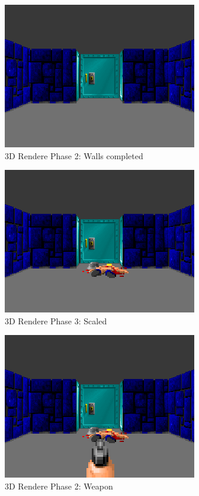 \documentclass[book.tex]{subfiles}
\begin{document}
 
 \begin{figure}[H]
\centering
 \includegraphics[scale=1.3]{screenshots/wolf4d_2_walls.png}
 \caption{3D Rendere Phase 2: Walls completed} \label{fig:mips}
 \end{figure}
 
 
 \begin{figure}[H]
\centering
 \includegraphics[scale=1.3]{screenshots/wolf3d_6_scaled}
 \caption{3D Rendere Phase 3: Scaled} \label{fig:mips}
 \end{figure}

 \begin{figure}[H]
\centering
 \includegraphics[scale=1.3]{screenshots/wolf3d_7_fullframe.png}
 \caption{3D Rendere Phase 2: Weapon} \label{fig:mips}
 \end{figure}
 
\end{document}
